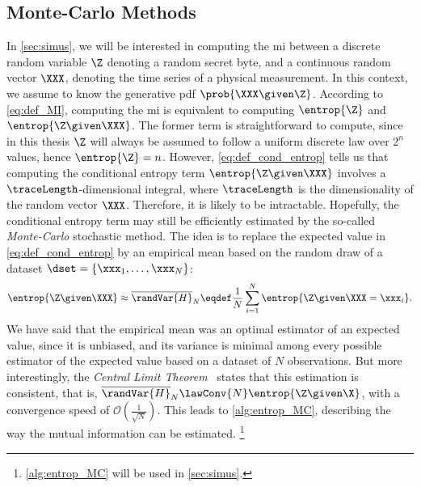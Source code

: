 \subsection{Monte-Carlo Methods}
\label{sec:monte-carlo}
In \autoref{sec:simus}, we will be interested in computing the \gls{mi} between a discrete random variable \(\Z\) denoting a random secret byte, and a continuous random vector \(\XXX\), denoting the time series of a physical measurement.
In this context, we assume to know the generative \gls{pdf} \(\prob{\XXX \given \Z}\).
According to \autoref{eq:def_MI}, computing the \gls{mi} is equivalent to computing \(\entrop{\Z}\) and \(\entrop{\Z \given \XXX}\).
The former term is straightforward to compute, since in this thesis \(\Z\) will always be assumed to follow a uniform discrete law over \(2^n\) values, hence \(\entrop{\Z} = n\).
However, \autoref{eq:def_cond_entrop} tells us that computing the conditional entropy term \(\entrop{\Z \given \XXX}\) involves a \(\traceLength\)-dimensional integral, where \(\traceLength\) is the dimensionality of the random vector \(\XXX\).
Therefore, it is likely to be intractable.
Hopefully, the conditional entropy term may still be efficiently estimated by the so-called \emph{Monte-Carlo} \gls{stochastic} method.
The idea is to replace the expected value in \autoref{eq:def_cond_entrop} by an empirical mean based on the random draw of a dataset \(\dset=\{\xxx_1, \ldots, \xxx_N\}\):
\begin{equation}
    \entrop{\Z \given \XXX} \approx \overline{\randVar{H}}_N \eqdef \frac{1}{N} \sum_{i=1}^N \entrop{\Z \given \XXX = \xxx_i}.
\end{equation}
We have said that the empirical mean was an optimal estimator of an expected value, since it is unbiased, and its variance is minimal among every possible estimator of the expected value based on a dataset of \(N\) observations.
But more interestingly, the \emph{Central Limit Theorem}~\cite[Thm.~15.37]{klenke2013probability} states that this estimation is \gls{consistent}, that is, 
\(\overline{\randVar{H}}_N \lawConv{N} \entrop{\Z \given \X}\), with a convergence speed of \(\mathcal{O}\left(\frac{1}{\sqrt{N}}\right)\).
This leads to \autoref{alg:entrop_MC}, describing the way the mutual information can be estimated.%
\footnote{
    \autoref{alg:entrop_MC} will be used in \autoref{sec:simus}.
}
